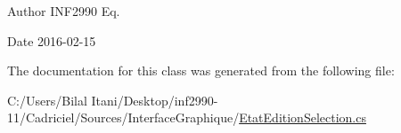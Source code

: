 \begin{DoxyAuthor}{Author}
I\+N\+F2990 Eq. 
\end{DoxyAuthor}
\begin{DoxyDate}{Date}
2016-\/02-\/15 
\end{DoxyDate}


The documentation for this class was generated from the following file\+:\begin{DoxyCompactItemize}
\item 
C\+:/\+Users/\+Bilal Itani/\+Desktop/inf2990-\/11/\+Cadriciel/\+Sources/\+Interface\+Graphique/\hyperlink{_etat_edition_selection_8cs}{Etat\+Edition\+Selection.\+cs}\end{DoxyCompactItemize}
